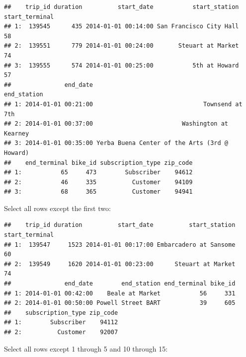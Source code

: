 \documentclass[]{book}
\newenvironment{Shaded}{\begin{snugshade}}{\end{snugshade}}
\newcommand{\DecValTok}[1]{\textcolor[rgb]{0.00,0.00,0.81}{#1}}
\newcommand{\KeywordTok}[1]{\textcolor[rgb]{0.13,0.29,0.53}{\textbf{#1}}}
\newcommand{\NormalTok}[1]{#1}
\newcommand{\OperatorTok}[1]{\textcolor[rgb]{0.81,0.36,0.00}{\textbf{#1}}}
\newcommand{\StringTok}[1]{\textcolor[rgb]{0.31,0.60,0.02}{#1}}
\begin{document}
\begin{verbatim}
##    trip_id duration          start_date           start_station start_terminal
## 1:  139545      435 2014-01-01 00:14:00 San Francisco City Hall             58
## 2:  139551      779 2014-01-01 00:24:00       Steuart at Market             74
## 3:  139555      574 2014-01-01 00:25:00           5th at Howard             57
##               end_date                                   end_station
## 1: 2014-01-01 00:21:00                               Townsend at 7th
## 2: 2014-01-01 00:37:00                         Washington at Kearney
## 3: 2014-01-01 00:35:00 Yerba Buena Center of the Arts (3rd @ Howard)
##    end_terminal bike_id subscription_type zip_code
## 1:           65     473        Subscriber    94612
## 2:           46     335          Customer    94109
## 3:           68     365          Customer    94941
\end{verbatim}

Select all rows except the first two:

\begin{Shaded}
\end{Shaded}

\begin{verbatim}
##    trip_id duration          start_date          start_station start_terminal
## 1:  139547     1523 2014-01-01 00:17:00 Embarcadero at Sansome             60
## 2:  139549     1620 2014-01-01 00:23:00      Steuart at Market             74
##               end_date        end_station end_terminal bike_id
## 1: 2014-01-01 00:42:00    Beale at Market           56     331
## 2: 2014-01-01 00:50:00 Powell Street BART           39     605
##    subscription_type zip_code
## 1:        Subscriber    94112
## 2:          Customer    92007
\end{verbatim}

Select all rows except 1 through 5 and 10 through 15:

\begin{Shaded}
\end{Shaded}
\end{document}
